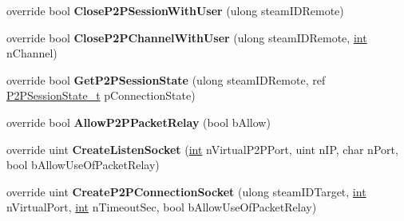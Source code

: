\begin{DoxyCompactItemize}
\item 
\hypertarget{classValve_1_1Steamworks_1_1CSteamNetworking_af1f26286c02806ae4ca7b7ff07bd5203}{}override bool {\bfseries Close\+P2\+P\+Session\+With\+User} (ulong steam\+I\+D\+Remote)\label{classValve_1_1Steamworks_1_1CSteamNetworking_af1f26286c02806ae4ca7b7ff07bd5203}

\item 
\hypertarget{classValve_1_1Steamworks_1_1CSteamNetworking_a0cf22b7a3e71aa7b9e0a68c071be8a14}{}override bool {\bfseries Close\+P2\+P\+Channel\+With\+User} (ulong steam\+I\+D\+Remote, \hyperlink{SDL__thread_8h_a6a64f9be4433e4de6e2f2f548cf3c08e}{int} n\+Channel)\label{classValve_1_1Steamworks_1_1CSteamNetworking_a0cf22b7a3e71aa7b9e0a68c071be8a14}

\item 
\hypertarget{classValve_1_1Steamworks_1_1CSteamNetworking_a265b226db0ccd7d3ab62bda795a2f4d9}{}override bool {\bfseries Get\+P2\+P\+Session\+State} (ulong steam\+I\+D\+Remote, ref \hyperlink{structValve_1_1Steamworks_1_1P2PSessionState__t}{P2\+P\+Session\+State\+\_\+t} p\+Connection\+State)\label{classValve_1_1Steamworks_1_1CSteamNetworking_a265b226db0ccd7d3ab62bda795a2f4d9}

\item 
\hypertarget{classValve_1_1Steamworks_1_1CSteamNetworking_acc217637dba4c199af46de15e7ca4e9f}{}override bool {\bfseries Allow\+P2\+P\+Packet\+Relay} (bool b\+Allow)\label{classValve_1_1Steamworks_1_1CSteamNetworking_acc217637dba4c199af46de15e7ca4e9f}

\item 
\hypertarget{classValve_1_1Steamworks_1_1CSteamNetworking_a5aa197cdad3e4da5245aa2ae3eea4a4f}{}override uint {\bfseries Create\+Listen\+Socket} (\hyperlink{SDL__thread_8h_a6a64f9be4433e4de6e2f2f548cf3c08e}{int} n\+Virtual\+P2\+P\+Port, uint n\+I\+P, char n\+Port, bool b\+Allow\+Use\+Of\+Packet\+Relay)\label{classValve_1_1Steamworks_1_1CSteamNetworking_a5aa197cdad3e4da5245aa2ae3eea4a4f}

\item 
\hypertarget{classValve_1_1Steamworks_1_1CSteamNetworking_a0830d176f2bec2d738134ab7f6d81837}{}override uint {\bfseries Create\+P2\+P\+Connection\+Socket} (ulong steam\+I\+D\+Target, \hyperlink{SDL__thread_8h_a6a64f9be4433e4de6e2f2f548cf3c08e}{int} n\+Virtual\+Port, \hyperlink{SDL__thread_8h_a6a64f9be4433e4de6e2f2f548cf3c08e}{int} n\+Timeout\+Sec, bool b\+Allow\+Use\+Of\+Packet\+Relay)\label{classValve_1_1Steamworks_1_1CSteamNetworking_a0830d176f2bec2d738134ab7f6d81837}


\end{DoxyCompactItemize}
